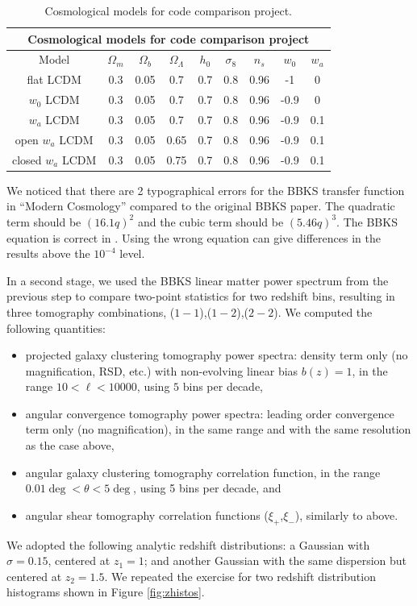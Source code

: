 \documentclass[\docopts]{\docclass}
\begin{document}
\begin{table}[t]
  \centering
  \begin{tabular}{ c | c c c c c c c c }
    \hline
    \multicolumn{9}{|c|}{Cosmological models for code comparison project} \\
    \hline
    \hline
    Model & $\Omega_m$ & $\Omega_b$ & $\Omega_\Lambda$ & $h_0$ & $\sigma_8$ & $n_s$ & $w_0$ & $w_a$ \\
    \hline
    flat LCDM & 0.3 & 0.05 & 0.7 & 0.7 & 0.8 & 0.96 & -1 & 0 \\
    $w_0$ LCDM & 0.3 & 0.05 & 0.7 & 0.7 & 0.8 & 0.96 & -0.9 & 0  \\
    $w_a$ LCDM & 0.3 & 0.05 & 0.7 & 0.7 & 0.8 & 0.96 & -0.9 & 0.1  \\
    open $w_a$ LCDM & 0.3 & 0.05 & 0.65 & 0.7 & 0.8 & 0.96 & -0.9 & 0.1  \\
    closed $w_a$ LCDM & 0.3 & 0.05 & 0.75 & 0.7 & 0.8 & 0.96 & -0.9 & 0.1  \\
    \hline
  \end{tabular}
  \caption{Cosmological models for code comparison project.}
  \label{tab:cosmologies}
\end{table}

We noticed that there are 2 typographical errors for the BBKS transfer function in ``Modern Cosmology'' \citep{DodelsonBook} compared to the original BBKS paper. The quadratic term should be $(16.1q)^2$ and the cubic term should be $(5.46q)^3$. The BBKS equation is correct in \citet{PeacockBook}. Using the wrong equation can give differences in the results above the $10^{-4}$ level.

In a second stage, we used the BBKS linear matter power spectrum from the previous step to compare two-point statistics for two redshift bins, resulting in three tomography combinations, ($1-1$),($1-2$),($2-2$). We computed the following quantities:
\begin{itemize}
\item projected galaxy clustering tomography power spectra: density term only (no magnification, RSD, etc.) with non-evolving linear bias $b(z) = 1$, in the range $10 < \ell < 10000$, using $5$ bins per decade,
\item angular convergence tomography power spectra: leading order convergence term only (no magnification), in the same range and with the same resolution as the case above,
\item angular galaxy clustering tomography correlation function, in the range $0.01 \deg < \theta < 5 \deg$, using 5 bins per decade, and
\item angular shear tomography correlation functions ($\xi_+$,$\xi_-$), similarly to above.
\end{itemize}
We adopted the following analytic redshift distributions: a Gaussian with $\sigma = 0.15$, centered at $z_1 = 1$; and another Gaussian with the same dispersion but centered at $z_2 = 1.5$. We repeated the exercise for two redshift distribution histograms shown in Figure \ref{fig:zhistos}.
\end{document}
